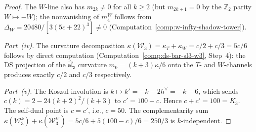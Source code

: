 \begin{proof}
The $W$-line also has $m_{2k} \neq 0$ for all $k \geq 2$ (but
$m_{2k+1} = 0$ by the $\mathbb{Z}_2$ parity $W \mapsto -W$);
the nonvanishing of $m_4^W$ follows from
$\Delta_W = 20480/[3(5c{+}22)^3] \neq 0$
(Computation~\ref{comp:w-infty-shadow-tower}).

\emph{Part~(iv).} The curvature decomposition
$\kappa(\mathcal{W}_3) = \kappa_T + \kappa_W = c/2 + c/3 = 5c/6$
follows by direct computation
(Computation~\ref{comp:ds-bar-sl3-w3}, Step~4): the
DS projection of the $\widehat{\mathfrak{sl}}_3$ curvature
$m_0 = (k{+}3)\kappa/6$ onto the $T$- and $W$-channels produces
exactly $c/2$ and $c/3$ respectively.

\emph{Part~(v).} The Koszul involution is
$k \mapsto k' = -k - 2h^\vee = -k - 6$, which sends
$c(k) = 2 - 24(k{+}2)^2/(k{+}3)$ to $c' = 100 - c$. Hence
$c + c' = 100 = K_3$.
The self-dual point is $c = c'$, i.e., $c = 50$.
The complementarity sum
$\kappa(\mathcal{W}_3^k) + \kappa(\mathcal{W}_3^{k'})
= 5c/6 + 5(100{-}c)/6 = 250/3$
is $k$-independent.
\end{proof}

